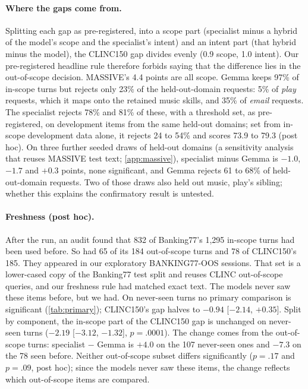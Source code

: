 \documentclass[11pt]{article}
\begin{document}
\paragraph{Where the gaps come from.} Splitting each gap as pre-registered, into a scope part (specialist minus a hybrid of the model's scope and the specialist's intent) and an intent part (that hybrid minus the model), the CLINC150 gap divides evenly (0.9 scope, 1.0 intent). Our pre-registered headline rule therefore forbids saying that the difference lies in the out-of-scope decision. MASSIVE's 4.4 points are all scope. Gemma keeps 97\% of in-scope turns but rejects only 23\% of the held-out-domain requests: 5\% of \emph{play} requests, which it maps onto the retained music skills, and 35\% of \emph{email} requests. The specialist rejects 78\% and 81\% of these, with a threshold set, as pre-registered, on development items from the same held-out domains; set from in-scope development data alone, it rejects 24 to 54\% and scores 73.9 to 79.3 (post hoc). On three further seeded draws of held-out domains (a sensitivity analysis that reuses MASSIVE test text; \cref{app:massive}), specialist minus Gemma is $-1.0$, $-1.7$ and $+0.3$ points, none significant, and Gemma rejects 61 to 68\% of held-out-domain requests. Two of those draws also held out music, play's sibling; whether this explains the confirmatory result is untested.

\paragraph{Freshness (post hoc).}
\label{sec:freshness}
After the run, an audit found that 832 of Banking77's 1,295 in-scope turns had been used before. So had 65 of its 184 out-of-scope turns and 78 of CLINC150's 185. They appeared in our exploratory BANKING77-OOS sessions. That set is a lower-cased copy of the Banking77 test split and reuses CLINC out-of-scope queries, and our freshness rule had matched exact text. The models never saw these items before, but we had. On never-seen turns no primary comparison is significant (\cref{tab:primary}); CLINC150's gap halves to $-0.94$ [$-2.14$, $+0.35$]. Split by component, the in-scope part of the CLINC150 gap is unchanged on never-seen turns ($-2.19$ [$-3.12$, $-1.32$], $p=.0001$). The change comes from the out-of-scope turns: specialist $-$ Gemma is $+4.0$ on the 107 never-seen ones and $-7.3$ on the 78 seen before. Neither out-of-scope subset differs significantly ($p=.17$ and $p=.09$, post hoc); since the models never saw these items, the change reflects which out-of-scope items are compared.
\end{document}
